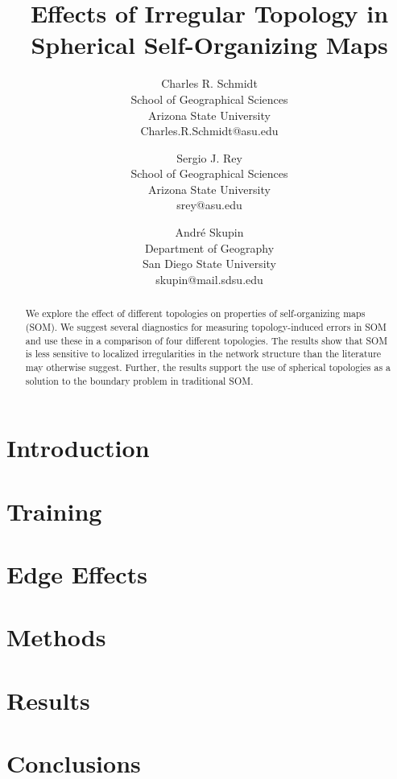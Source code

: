 \documentclass{article}
\begin{document}
\title{Effects of Irregular Topology in Spherical Self-Organizing Maps}

\author{
Charles R. Schmidt\\ School of Geographical Sciences\\Arizona State University\\Charles.R.Schmidt@asu.edu
\and
Sergio J. Rey\\ School of Geographical Sciences\\Arizona State University\\srey@asu.edu
\and
Andr\'e Skupin\\ Department of Geography\\San Diego State University\\skupin@mail.sdsu.edu
}

\maketitle
\thispagestyle{empty}

\begin{abstract}
We explore the effect of different topologies on properties of self-organizing
maps (SOM). We suggest several diagnostics for measuring
topology-induced errors in SOM and use these in a comparison of four different
topologies. The results show that SOM is less sensitive to localized
irregularities in the network structure than the literature may otherwise
suggest.  Further, the results support the use of spherical topologies as a
solution to the boundary problem in traditional SOM.
  
\end{abstract}



\section{Introduction}

\section{Training}


\section{Edge Effects} %



\section{Methods} %


\section{Results} %

\section{Conclusions} %



\end{document}
